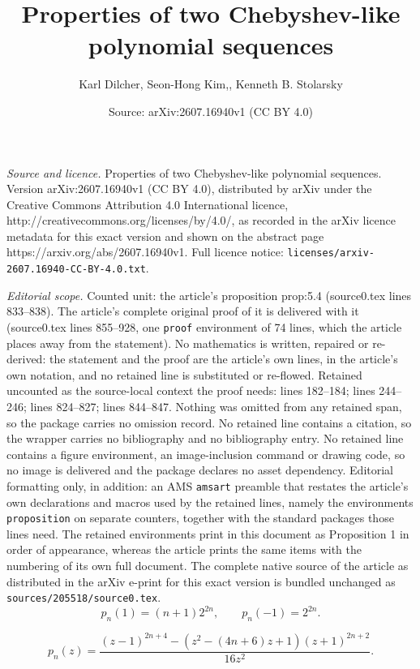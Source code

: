 \documentclass[10pt,a4paper]{amsart}
\title{Properties of two Chebyshev-like polynomial sequences}
\author{Karl Dilcher, Seon-Hong Kim,, Kenneth B. Stolarsky}
\date{Source: arXiv:2607.16940v1 (CC BY 4.0)}
\begin{document}
\maketitle

\noindent\emph{Source and licence.} Properties of two Chebyshev-like polynomial sequences. Version arXiv:2607.16940v1 (CC BY 4.0), distributed by arXiv under the Creative Commons Attribution 4.0 International licence, http://creativecommons.org/licenses/by/4.0/, as recorded in the arXiv licence metadata for this exact version and shown on the abstract page https://arxiv.org/abs/2607.16940v1. Full licence notice: \texttt{licenses/arxiv-2607.16940-CC-BY-4.0.txt}.\par\smallskip

\noindent\textit{Editorial scope.} Counted unit: the article's proposition prop:5.4 (source0.tex lines 833--838). The article's complete original proof of it is delivered with it (source0.tex lines 855--928, one \texttt{proof} environment of 74 lines, which the article places away from the statement). No mathematics is written, repaired or re-derived: the statement and the proof are the article's own lines, in the article's own notation, and no retained line is substituted or re-flowed.  Retained uncounted as the source-local context the proof needs: lines 182--184; lines 244--246; lines 824--827; lines 844--847.  Nothing was omitted from any retained span, so the package carries no omission record.  No retained line contains a citation, so the wrapper carries no bibliography and no bibliography entry.  No retained line contains a figure environment, an image-inclusion command or drawing code, so no image is delivered and the package declares no asset dependency.  Editorial formatting only, in addition: an AMS \texttt{amsart} preamble that restates the article's own declarations and macros used by the retained lines, namely the environments \texttt{proposition} on separate counters, together with the standard packages those lines need.  The retained environments print in this document as Proposition 1 in order of appearance, whereas the article prints the same items with the numbering of its own full document.  The complete native source of the article as distributed in the arXiv e-print for this exact version is bundled unchanged as \texttt{sources/205518/source0.tex}.
\begin{equation}\label{2.6}
p_n(1) = (n+1)2^{2n},\qquad p_n(-1) = 2^{2n}.
\end{equation}

\begin{equation}\label{2.10}
p_n(z)=\frac{(z-1)^{2n+4}-\left(z^2-(4n+6)z+1\right)(z+1)^{2n+2}}{16z^2}.
\end{equation}
\end{document}
